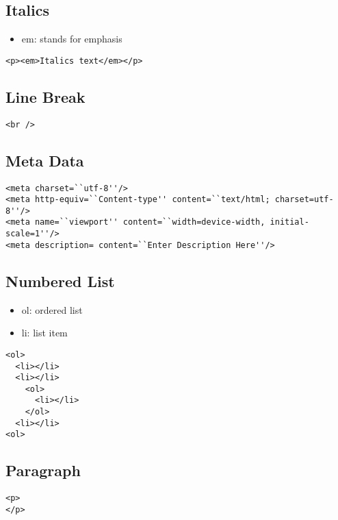 \documentclass{article}
\begin{document}
\subsection{Italics}
\begin{itemize}
  \item em: stands for emphasis
\end{itemize}

\begin{lstlisting}
<p><em>Italics text</em></p>
\end{lstlisting}

\subsection{Line Break}
\begin{lstlisting}
<br />
\end{lstlisting}

\subsection{Meta Data}
\begin{lstlisting}
<meta charset=``utf-8''/>
<meta http-equiv=``Content-type'' content=``text/html; charset=utf-8''/>
<meta name=``viewport'' content=``width=device-width, initial-scale=1''/>
<meta description= content=``Enter Description Here''/>
\end{lstlisting}

\subsection{Numbered List}
\begin{itemize}
  \item ol: ordered list
  \item li: list item
\end{itemize}

\begin{lstlisting}
<ol>
  <li></li>
  <li></li>
    <ol>
      <li></li>
    </ol>
  <li></li>
<ol>
\end{lstlisting}

\subsection{Paragraph}
\begin{lstlisting}
<p>
</p>
\end{lstlisting}
\end{document}
